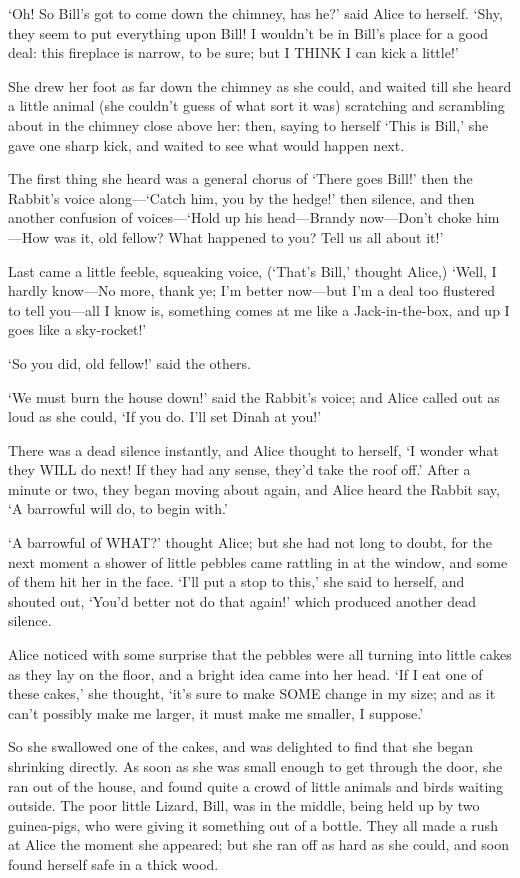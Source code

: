 \documentclass[12pt]{article}
\begin{document}
\begin{Parallel}[p]{}{}
{‘Oh! So Bill’s got to come down the chimney, has he?’ said Alice to herself. ‘Shy, they seem to put everything upon Bill! I wouldn’t be in Bill’s place for a good deal: this fireplace is narrow, to be sure; but I THINK I can kick a little!’

She drew her foot as far down the chimney as she could, and waited till she heard a little animal (she couldn’t guess of what sort it was) scratching and scrambling about in the chimney close above her: then, saying to herself ‘This is Bill,’ she gave one sharp kick, and waited to see what would happen next.

The first thing she heard was a general chorus of ‘There goes Bill!’ then the Rabbit’s voice along—‘Catch him, you by the hedge!’ then silence, and then another confusion of voices—‘Hold up his head—Brandy now—Don’t choke him—How was it, old fellow? What happened to you? Tell us all about it!’

Last came a little feeble, squeaking voice, (‘That’s Bill,’ thought Alice,) ‘Well, I hardly know—No more, thank ye; I’m better now—but I’m a deal too flustered to tell you—all I know is, something comes at me like a Jack-in-the-box, and up I goes like a sky-rocket!’

‘So you did, old fellow!’ said the others.

‘We must burn the house down!’ said the Rabbit’s voice; and Alice called out as loud as she could, ‘If you do. I’ll set Dinah at you!’

There was a dead silence instantly, and Alice thought to herself, ‘I wonder what they WILL do next! If they had any sense, they’d take the roof off.’ After a minute or two, they began moving about again, and Alice heard the Rabbit say, ‘A barrowful will do, to begin with.’

‘A barrowful of WHAT?’ thought Alice; but she had not long to doubt, for the next moment a shower of little pebbles came rattling in at the window, and some of them hit her in the face. ‘I’ll put a stop to this,’ she said to herself, and shouted out, ‘You’d better not do that again!’ which produced another dead silence.

Alice noticed with some surprise that the pebbles were all turning into little cakes as they lay on the floor, and a bright idea came into her head. ‘If I eat one of these cakes,’ she thought, ‘it’s sure to make SOME change in my size; and as it can’t possibly make me larger, it must make me smaller, I suppose.’

So she swallowed one of the cakes, and was delighted to find that she began shrinking directly. As soon as she was small enough to get through the door, she ran out of the house, and found quite a crowd of little animals and birds waiting outside. The poor little Lizard, Bill, was in the middle, being held up by two guinea-pigs, who were giving it something out of a bottle. They all made a rush at Alice the moment she appeared; but she ran off as hard as she could, and soon found herself safe in a thick wood.

}
\end{Parallel}
\end{document}
